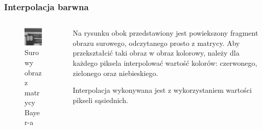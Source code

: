 \documentclass{beamer}
\begin{document}
\begin{frame}
	\frametitle{Interpolacja barwna}
	
	\begin{columns}
	\begin{column}{4cm}
    \begin{center}
    \begin{figure}

	  \includegraphics[width=\textwidth]{raw_image}
	  \caption{Surowy obraz z matrycy Bayer-a}
	  \label{fig:raw_image}
    \end{figure}
    \end{center}
  \end{column}
  \begin{column}{6cm}
	Na rysunku obok przedstawiony jest powiekszony fragment obrazu surowego, odczytanego prosto z matrycy.
	Aby przekształcić taki obraz w obraz kolorowy, należy dla każdego piksela interpolować wartość kolorów:
	{\color{red}czerwonego}, {\color{green}zielonego} oraz {\color{blue}niebieskiego}.
	
	Interpolacja wykonywana jest z wykorzystaniem wartości pikseli sąsiednich.
  \end{column}
  \end{columns}
\end{frame}
\end{document}
